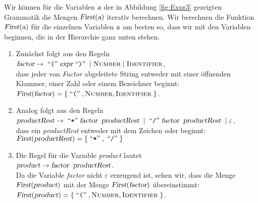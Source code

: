 \example
Wir können für die Variablen $\textsl{a}$ der in Abbildung \ref{fig:Expr3} gezeigten Grammatik 
die Mengen $\textsl{First}(\textsl{a})$ iterativ berechnen.  Wir berechnen
die Funktion $\textsl{First}(\textsl{a})$ für die einzelnen Variablen $\textsl{a}$ am besten so, dass wir mit den
Variablen beginnen, die in der Hierarchie ganz unten stehen. 
\begin{enumerate}
\item Zunächst folgt aus den Regeln
      \\[0.2cm]
      \hspace*{1.3cm}
      $\textsl{factor} \rightarrow \;\mbox{``\texttt{(}''}\; \textsl{expr} \;\mbox{``\texttt{)}''}\; \mid \textsc{Number} \mid \textsc{Identifier}$,
      \\[0.2cm]
      dass jeder von \textsl{Factor} abgeleitete String entweder mit einer öffnenden
      Klammer, einer Zahl oder einem Bezeichner beginnt:
      \\[0.2cm]
      \hspace*{1.3cm}
      $\textsl{First}(\textsl{factor}) = \{ \;\mbox{``\texttt{(}''}\;, \textsc{Number}, \textsc{Identifier}\; \}$.
\item Analog folgt aus den Regeln 
      \\[0.2cm]
      \hspace*{1.3cm}
      $\textsl{productRest} \rightarrow \;\mbox{``\texttt{*}''}\; \textsl{factor}\;\;\textsl{productRest} \;
                            \mid        \;\mbox{``\texttt{/}''}\; \textsl{factor}\;\;\textsl{productRest} \;
                            \mid        \varepsilon$,
      \\[0.2cm]
      dass ein \textsl{productRest} entweder mit dem Zeichen \qote{*} oder \qote{/} beginnt:
      \\[0.2cm]
      \hspace*{1.3cm}
      $\textsl{First}(\textsl{productRest}) = \{ \;\mbox{``\texttt{*}''}\;, \;\mbox{``\texttt{/}''}\; \}$
\item Die Regel für die Variable \textsl{product} lautet
      \\[0.2cm]
      \hspace*{1.3cm}
      $\textsl{product} \rightarrow \textsl{factor}\;\;\textsl{productRest}$.
      \\[0.2cm]
      Da die Variable \textsl{factor} nicht $\varepsilon$ erzeugend ist, sehen wir, dass
      die Menge $\textsl{First}(\textsl{product})$ mit der Menge
      $\textsl{First}(\textsl{factor})$ übereinstimmt:
      \\[0.2cm]
      \hspace*{1.3cm}
      $\textsl{First}(\textsl{product}) = \{ \;\mbox{``\texttt{(}''}\;, \textsc{Number}, \textsc{Identifier}\; \}$.

\end{enumerate}
